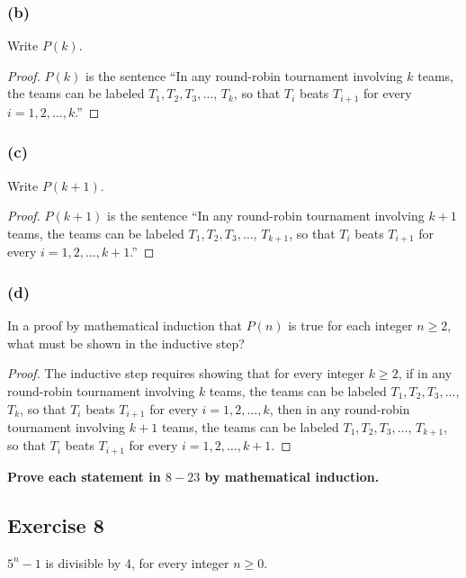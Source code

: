 \documentclass[14pt]{extarticle}
\newcommand{\cy}{\color{cyan}}
\begin{document}
\subsubsection{(b)}
Write $P(k)$.

\begin{proof}
$P(k)$ is the sentence ``In any round-robin tournament involving $k$ teams, the teams can be labeled $T_1, T_2, T_3, \ldots$, $T_k$, so that $T_i$ beats $T_{i + 1}$ for every $i = 1, 2, \ldots, k$.''
\end{proof}

\subsubsection{(c)}
Write $P(k + 1)$.

\begin{proof}
$P(k + 1)$ is the sentence ``In any round-robin tournament involving $k + 1$ teams, the teams can be labeled $T_1, T_2, T_3, \ldots$, $T_{k + 1}$, so that $T_i$ beats $T_{i + 1}$ for every $i = 1, 2, \ldots, k + 1$.''
\end{proof}

\subsubsection{(d)}
In a proof by mathematical induction that $P(n)$ is true for each integer $n \geq 2$, what must be shown in the inductive step?

\begin{proof}
The inductive step requires showing that for every integer $k \geq 2$, if in any round-robin tournament involving $k$ teams, the teams can be labeled $T_1, T_2, T_3, \ldots$, $T_k$, so that $T_i$ beats $T_{i + 1}$ for every $i = 1, 2, \ldots, k$, then in any round-robin tournament involving $k + 1$ teams, the teams can be labeled $T_1, T_2, T_3, \ldots$, $T_{k + 1}$, so that $T_i$ beats $T_{i + 1}$ for every $i = 1, 2, \ldots, k + 1$.
\end{proof}

{\bf \cy Prove each statement in $8-23$ by mathematical induction.}

\subsection{Exercise 8}
$5^n - 1$ is divisible by 4, for every integer $n \geq 0$.
\end{document}
